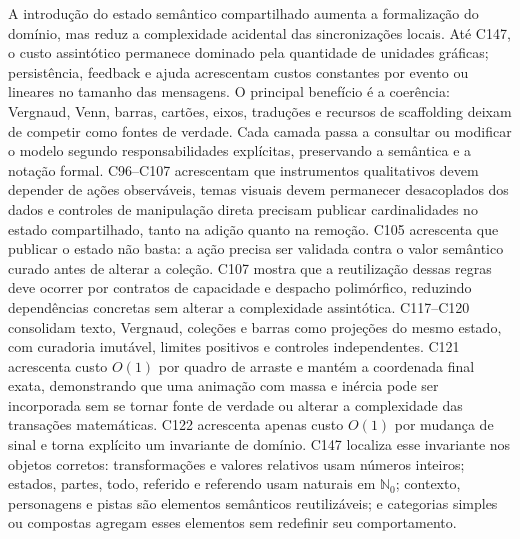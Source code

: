 \documentclass[12pt,a4paper]{article}
\begin{document}
A introdução do estado semântico compartilhado aumenta a formalização do domínio, mas reduz a complexidade acidental das sincronizações locais. Até C147, o custo assintótico permanece dominado pela quantidade de unidades gráficas; persistência, feedback e ajuda acrescentam custos constantes por evento ou lineares no tamanho das mensagens. O principal benefício é a coerência: Vergnaud, Venn, barras, cartões, eixos, traduções e recursos de scaffolding deixam de competir como fontes de verdade. Cada camada passa a consultar ou modificar o modelo segundo responsabilidades explícitas, preservando a semântica e a notação formal. C96--C107 acrescentam que instrumentos qualitativos devem depender de ações observáveis, temas visuais devem permanecer desacoplados dos dados e controles de manipulação direta precisam publicar cardinalidades no estado compartilhado, tanto na adição quanto na remoção. C105 acrescenta que publicar o estado não basta: a ação precisa ser validada contra o valor semântico curado antes de alterar a coleção. C107 mostra que a reutilização dessas regras deve ocorrer por contratos de capacidade e despacho polimórfico, reduzindo dependências concretas sem alterar a complexidade assintótica. C117--C120 consolidam texto, Vergnaud, coleções e barras como projeções do mesmo estado, com curadoria imutável, limites positivos e controles independentes. C121 acrescenta custo $O(1)$ por quadro de arraste e mantém a coordenada final exata, demonstrando que uma animação com massa e inércia pode ser incorporada sem se tornar fonte de verdade ou alterar a complexidade das transações matemáticas. C122 acrescenta apenas custo $O(1)$ por mudança de sinal e torna explícito um invariante de domínio. C147 localiza esse invariante nos objetos corretos: transformações e valores relativos usam números inteiros; estados, partes, todo, referido e referendo usam naturais em $\mathbb{N}_0$; contexto, personagens e pistas são elementos semânticos reutilizáveis; e categorias simples ou compostas agregam esses elementos sem redefinir seu comportamento.
\end{document}
